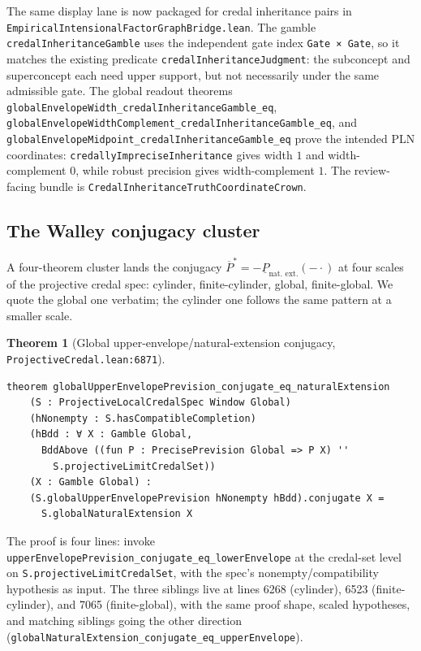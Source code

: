 \documentclass[]{article}
\newtheorem{theorem}{Theorem}
\newcommand{\lid}[1]{{\ttfamily\nolinkurl{#1}}}
\newcommand{\lpath}[1]{\texttt{\nolinkurl{#1}}}
\begin{document}
\noindent The same display lane is now packaged for credal inheritance pairs in
\lpath{EmpiricalIntensionalFactorGraphBridge.lean}.  The gamble
\lid{credalInheritanceGamble} uses the independent gate index
\lid{Gate × Gate}, so it matches the existing predicate
\lid{credalInheritanceJudgment}: the subconcept and superconcept each need upper
support, but not necessarily under the same admissible gate.  The global readout
theorems \lid{globalEnvelopeWidth\_credalInheritanceGamble\_eq},
\lid{globalEnvelopeWidthComplement\_credalInheritanceGamble\_eq}, and
\lid{globalEnvelopeMidpoint\_credalInheritanceGamble\_eq} prove the intended PLN
coordinates: \lid{credallyImpreciseInheritance} gives width $1$ and
width-complement $0$, while robust precision gives width-complement $1$.  The
review-facing bundle is \lid{CredalInheritanceTruthCoordinateCrown}.

\subsection{The Walley conjugacy cluster}\label{sec:walley-cluster}

A four-theorem cluster lands the conjugacy $\overline{P}^\ast = -\underline{P}_{\text{nat. ext.}}(-\cdot)$
at four scales of the projective credal spec: cylinder, finite-cylinder, global,
finite-global. We quote the global one verbatim; the cylinder one follows the same
pattern at a smaller scale.

\begin{theorem}[Global upper-envelope/natural-extension conjugacy,
\lpath{ProjectiveCredal.lean:6871}]\label{thm:walley-global}
\begin{lstlisting}
theorem globalUpperEnvelopePrevision_conjugate_eq_naturalExtension
    (S : ProjectiveLocalCredalSpec Window Global)
    (hNonempty : S.hasCompatibleCompletion)
    (hBdd : ∀ X : Gamble Global,
      BddAbove ((fun P : PrecisePrevision Global => P X) ''
        S.projectiveLimitCredalSet))
    (X : Gamble Global) :
    (S.globalUpperEnvelopePrevision hNonempty hBdd).conjugate X =
      S.globalNaturalExtension X
\end{lstlisting}
\end{theorem}

\noindent The proof is four lines: invoke
\lid{upperEnvelopePrevision\_conjugate\_eq\_lowerEnvelope} at the credal-set level
on \lid{S.projectiveLimitCredalSet}, with the spec's nonempty/compatibility
hypothesis as input. The three siblings live at lines 6268 (cylinder), 6523
(finite-cylinder), and 7065 (finite-global), with the same proof shape, scaled
hypotheses, and matching siblings going the other direction
(\lid{globalNaturalExtension\_conjugate\_eq\_upperEnvelope}).
\end{document}

